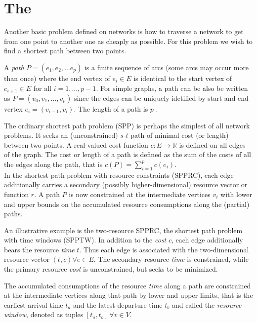 \section{The \spprc{}}
Another basic problem defined on networks is how to traverse a network to get from one point to another one as cheaply as possible. For this problem we wish to find a shortest path between two points.

\begin{definition}[path]
A \textit{path} $P = (e_1, e_2, ... e_p)$ is a finite sequence of arcs (some arcs may occur more than once) where the end vertex of $e_i \in E$ is identical to the start vertex of $e_{i+1} \in E$ for all $i=1,\dots,p-1$. For simple graphs, a path can be also be written as $P = (v_0,v_1,\dots,v_p)$ since the edges can be uniquely idetified by start and end vertex $e_i=(v_{i-1},v_i)$. The length of a path is $p$ \cite{irnich2005shortest}.
\end{definition}


The ordinary shortest path problem (SPP) is perhaps the simplest of all network problems. It seeks an (unconstrained) $s$-$t$ path of minimal cost (or length) between two points. A real-valued cost function $c : E \rightarrow \mathbb{R}$ is defined on all edges of the graph. The cost or length of a path is defined as the sum of the costs of all the edges along the path, that is $c(P)=\sum_{i=1}^p c(e_i)$. \\



In the shortest path problem with resource constraints (SPPRC), each edge additionally carries a secondary (possibly higher-dimensional) resource vector or function $r$. A path $P$ is now constrained at the intermediate vertices $v_i$ with lower and upper bounds on the accumulated resource consumptions along the (partial) paths.\\

\begin{example}[SPPTW]
An illustrative example is the two-resource SPPRC, the shortest path problem with time windows (SPPTW). In addition to the \textit{cost} $c$, each edge additionally bears the resource \textit{time} $t$. Thus each edge is associated with the two-dimensional resource vector $(t,c) \forall e \in E$. The secondary resource \textit{time} is constrained, while the primary resource \textit{cost} is unconstrained, but seeks to be minimized.

The accumulated consumptions of the resource \textit{time} along a path are constrained at the intermediate vertices along that path by lower and upper limits, that is the earliest arrival time $t_a$ and the latest departure time $t_b$ and called the \textit{resource window}, denoted as tuples $[t_a,t_b] \, \forall v \in V$.
\end{example}



